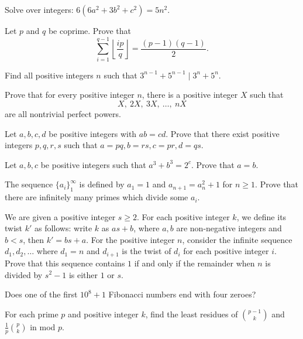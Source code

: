 \begin{problem}{\label{p:n:n:pr:8}}
  Solve over integers: $6(6a^2 + 3b^2 + c^2) = 5n^2$.
\end{problem}
\begin{problem}{\label{p:n:n:pr:9}}
  Let $p$ and $q$ be coprime. Prove that
      \[\sum_{i=1}^{q-1}\left\lfloor\frac{ip}{q}\right\rfloor=\frac{(p-1)(q-1)}2.\]
\end{problem}
\begin{problem}{\label{p:n:n:pr:9b}}
        Find all positive integers $n$ such that $3^{n-1}+5^{n-1}\mid
      3^n+5^n$.
\end{problem}
\begin{problem}{\label{p:n:n:pr:10}}
  Prove that for every positive integer $n$, there is a positive integer
    $X$ such that \[X,\ 2X,\ 3X,\ \ldots,\ nX\] are all nontrivial perfect powers.
\end{problem}
\begin{problem}{\label{p:n:n:pr:10b}}
      Let $a,b,c,d$ be positive integers with $ab=cd$. Prove that there
      exist positive integers $p,q,r,s$ such that \(a=pq,b=rs,c=pr,d=qs\).
\end{problem}
\begin{problem}{\label{p:n:n:pr:11}}
Let $a,b,c$ be positive integers such that $a^3+b^3=2^c$. Prove that
      $a=b$.
\end{problem}
\begin{problem}{\label{p:n:n:pr:12}}
  The sequence $\{a_i\}_1^\infty$ is defined by $a_1 = 1$ and
    $a_{n+1}=a_n^2+1$ for $n\ge 1$. Prove that there are infinitely many primes
    which divide some $a_i$.
\end{problem}
\begin{problem}{\label{p:n:n:pr:13}}
    We are given a positive integer $s \ge 2$. For each positive integer
    $k$, we define its twist $k'$ as follows: write $k$ as $as+b$, where $a, b$
    are non-negative integers and $b < s$, then $k' = bs+a$. For the positive
    integer $n$, consider the infinite sequence $d_1, d_2, \dots$ where $d_1=n$
    and $d_{i+1}$ is the twist of $d_i$ for each positive integer $i$.
    Prove that this sequence contains $1$ if and only if the remainder when $n$
    is divided by $s^2-1$ is either $1$ or $s$.
\end{problem}
\begin{problem}{\label{p:n:n:pr:14}}
    Does one of the first $10^8+1$ Fibonacci numbers end with four zeroes?
\end{problem}
\begin{problem}{\label{p:n:n:pr:14b}}
    For each prime $p$ and positive integer $k$, find the least residues of 
    \(\binom {p-1}k\) and \(\frac1p\binom pk\) in mod $p$.
\end{problem}
